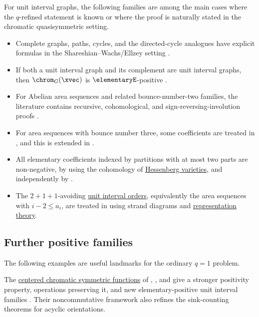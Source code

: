 For unit interval graphs, the following families are among the main cases
where the $q$-refined statement is known or where the proof is naturally
stated in the chromatic quasisymmetric setting.

\begin{itemize}
\item
Complete graphs, paths, cycles, and the directed-cycle analogues have explicit
formulas in the Shareshian--Wachs/Ellzey setting
\cite{ShareshianWachs2012,Ellzey2017,AlexanderssonPanova2018}.

\item
If both a unit interval graph and its complement are unit interval graphs, then
$\chrom_G(\xvec)$ is $\elementaryE$-positive
\cite{FoleyHoangMerkel2019}.

\item
For Abelian area sequences and related bounce-number-two families, the
literature contains recursive, cohomological, and sign-reversing-involution
proofs \cite{HaradaPrecup2019,ChoHuh2019,NadeauTewari2022x,LeeSoh2022x}.

\item
For area sequences with bounce number three, some coefficients are treated in
\cite{ChoHong2019}, and this is extended in \cite{Wang2022x}.

\item
All elementary coefficients indexed by partitions with at most two parts are
non-negative, by \cite{AbreuNigro2023x} using the cohomology of
\hyperref[hessenbergVarieties]{Hessenberg varieties}, and independently by
\cite{RokSzenes2023x}.

\item
The $2+1+1$-avoiding \hyperref[unitIntervalOrder]{unit interval orders},
equivalently the area sequences with $i-2 \leq a_i$, are treated in
\cite{McDonoughPylyavskyyWang2024x} using strand diagrams and
\hyperref[representationTheory]{representation theory}.
\end{itemize}



\subsection[chromaticEExpansionOrdinaryFamilies]{Further positive families}

The following examples are useful landmarks for the ordinary $q=1$ problem.

\label{chromaticECenteredPositivity}
The \hyperref[centeredChromaticSymmetricFunction]{centered chromatic
symmetric functions} of , , and
 give a stronger positivity property,
operations preserving it, and new elementary-positive unit interval families
\cite{AliniaeifardWangWilligenburg2024}. Their noncommutative framework also
refines the sink-counting theorems for acyclic orientations.

